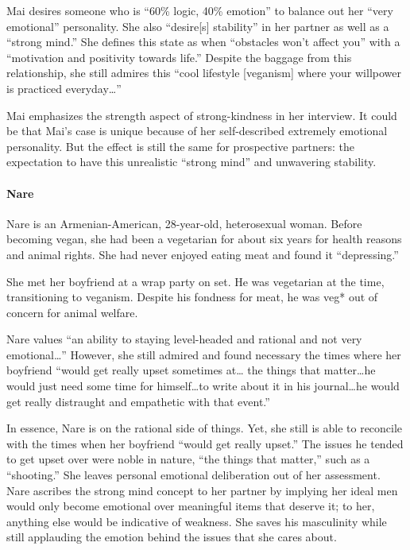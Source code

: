 \documentclass[twoside]{report}
\begin{document}
Mai desires someone who is ``60\% logic, 40\% emotion'' to balance out
her ``very emotional'' personality. She also ``desire{[}s{]} stability''
in her partner as well as a ``strong mind.'' She defines this state as
when ``obstacles won't affect you'' with a ``motivation and positivity
towards life.'' Despite the baggage from this relationship, she still
admires this ``cool lifestyle {[}veganism{]} where your willpower is
practiced everyday\ldots''

Mai emphasizes the strength aspect of strong-kindness in her interview.
It could be that Mai's case is unique because of her self-described
extremely emotional personality. But the effect is still the same for
prospective partners: the expectation to have this unrealistic ``strong
mind'' and unwavering stability.

\paragraph{Nare}

Nare is an Armenian-American, 28-year-old, heterosexual woman. Before
becoming vegan, she had been a vegetarian for about six years for health reasons and animal rights. She had
never enjoyed eating meat and found it ``depressing.''

She met her boyfriend at a wrap party on set. He was vegetarian at the time, transitioning to veganism. Despite his fondness for meat, he was veg* out of concern for animal welfare.

Nare values ``an ability to staying level-headed and rational and not
very emotional\ldots'' However, she still admired and found necessary
the times where her boyfriend ``would get really upset sometimes at\dots
the things that matter\dots he would just need some time for himself\dots to
write about it in his journal\dots he would get really distraught and
empathetic with that event.''

In essence, Nare is on the rational side of things. Yet, she still is
able to reconcile with the times when her boyfriend ``would get really
upset.'' The issues he tended to get upset over were noble in nature,
``the things that matter,'' such as a ``shooting.'' She leaves personal
emotional deliberation out of her assessment. Nare ascribes the strong
mind concept to her partner by implying her ideal men would only become
emotional over meaningful items that deserve it; to her, anything else
would be indicative of weakness. She saves his masculinity while still applauding the emotion behind the issues that she cares about.
\end{document}
